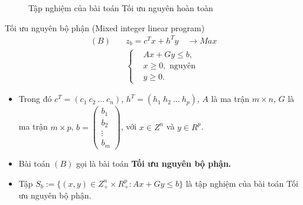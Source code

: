 \documentclass[12pt,a4paper]{report}
\begin{document}
\begin{figure}
\center
	
\caption{Tập nghiệm của bài toán Tối ưu nguyên hoàn toàn}
\end{figure}


{Tối ưu nguyên bộ phận (Mixed integer linear program)}
\begin{equation}\label{B}
\begin{split}
(B) \quad & z_b=c^Tx+h^Ty \quad \longrightarrow Max \\
          & \left\{\begin{split}
            &Ax+Gy \leq  b, \\
            &x \geq 0, \text{ nguyên} \\
            &y \geq 0.
            \end{split}\right.    
\end{split}
\end{equation}    
\begin{itemize} 
\item Trong đó $c^T=(c_1 \: c_2 \: \ldots \: c_n)$, $h^T=(h_1 \: h_2 \: \ldots \: h_p)$, $A$ là ma trận $m\times n$, $G$ là ma trận $m\times p$, $b=\begin{pmatrix}
    b_1 \\
    b_2 \\
    \vdots \\
    b_m
    \end{pmatrix}$, với $x\in Z^n$ và $y\in R^p$.
\item Bài toán $(B)$ gọi là bài toán \textbf{Tối ưu nguyên bộ phận.}
\item Tập $S_b:=\{(x,y)\in Z^n_+\times R^p_+: Ax+Gy\leq b\}$ là tập nghiệm của bài toán Tối ưu nguyên bộ phận.
\end{itemize}
\end{document}
